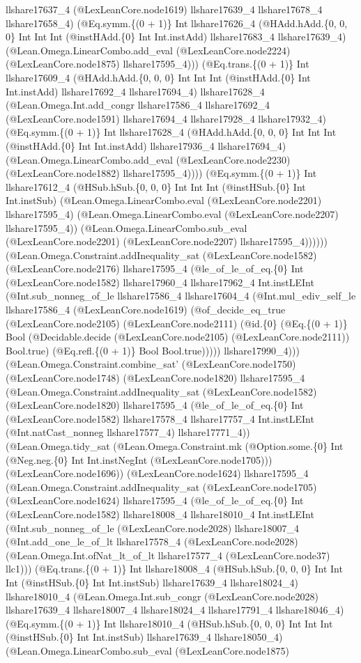 \documentclass[11pt]{article}
\begin{document}
llshare17637\_4 (@LexLeanCore.node1619) llshare17639\_4 llshare17678\_4 llshare17658\_4) (@Eq.symm.\{(0 + 1)\} Int llshare17626\_4 (@HAdd.hAdd.\{0, 0, 0\} Int Int Int (@instHAdd.\{0\} Int Int.instAdd) llshare17683\_4 llshare17639\_4) (@Lean.Omega.LinearCombo.add\_eval (@LexLeanCore.node2224) (@LexLeanCore.node1875) llshare17595\_4))) (@Eq.trans.\{(0 + 1)\} Int llshare17609\_4 (@HAdd.hAdd.\{0, 0, 0\} Int Int Int (@instHAdd.\{0\} Int Int.instAdd) llshare17692\_4 llshare17694\_4) llshare17628\_4 (@Lean.Omega.Int.add\_congr llshare17586\_4 llshare17692\_4 (@LexLeanCore.node1591) llshare17694\_4 llshare17928\_4 llshare17932\_4) (@Eq.symm.\{(0 + 1)\} Int llshare17628\_4 (@HAdd.hAdd.\{0, 0, 0\} Int Int Int (@instHAdd.\{0\} Int Int.instAdd) llshare17936\_4 llshare17694\_4) (@Lean.Omega.LinearCombo.add\_eval (@LexLeanCore.node2230) (@LexLeanCore.node1882) llshare17595\_4)))) (@Eq.symm.\{(0 + 1)\} Int llshare17612\_4 (@HSub.hSub.\{0, 0, 0\} Int Int Int (@instHSub.\{0\} Int Int.instSub) (@Lean.Omega.LinearCombo.eval (@LexLeanCore.node2201) llshare17595\_4) (@Lean.Omega.LinearCombo.eval (@LexLeanCore.node2207) llshare17595\_4)) (@Lean.Omega.LinearCombo.sub\_eval (@LexLeanCore.node2201) (@LexLeanCore.node2207) llshare17595\_4)))))) (@Lean.Omega.Constraint.addInequality\_sat (@LexLeanCore.node1582) (@LexLeanCore.node2176) llshare17595\_4 (@le\_of\_le\_of\_eq.\{0\} Int (@LexLeanCore.node1582) llshare17960\_4 llshare17962\_4 Int.instLEInt (@Int.sub\_nonneg\_of\_le llshare17586\_4 llshare17604\_4 (@Int.mul\_ediv\_self\_le llshare17586\_4 (@LexLeanCore.node1619) (@of\_decide\_eq\_true (@LexLeanCore.node2105) (@LexLeanCore.node2111) (@id.\{0\} (@Eq.\{(0 + 1)\} Bool (@Decidable.decide (@LexLeanCore.node2105) (@LexLeanCore.node2111)) Bool.true) (@Eq.refl.\{(0 + 1)\} Bool Bool.true))))) llshare17990\_4))) (@Lean.Omega.Constraint.combine\_sat' (@LexLeanCore.node1750) (@LexLeanCore.node1748) (@LexLeanCore.node1820) llshare17595\_4 (@Lean.Omega.Constraint.addInequality\_sat (@LexLeanCore.node1582) (@LexLeanCore.node1820) llshare17595\_4 (@le\_of\_le\_of\_eq.\{0\} Int (@LexLeanCore.node1582) llshare17578\_4 llshare17757\_4 Int.instLEInt (@Int.natCast\_nonneg llshare17577\_4) llshare17771\_4)) (@Lean.Omega.tidy\_sat (@Lean.Omega.Constraint.mk (@Option.some.\{0\} Int (@Neg.neg.\{0\} Int Int.instNegInt (@LexLeanCore.node1705))) (@LexLeanCore.node1696)) (@LexLeanCore.node1624) llshare17595\_4 (@Lean.Omega.Constraint.addInequality\_sat (@LexLeanCore.node1705) (@LexLeanCore.node1624) llshare17595\_4 (@le\_of\_le\_of\_eq.\{0\} Int (@LexLeanCore.node1582) llshare18008\_4 llshare18010\_4 Int.instLEInt (@Int.sub\_nonneg\_of\_le (@LexLeanCore.node2028) llshare18007\_4 (@Int.add\_one\_le\_of\_lt llshare17578\_4 (@LexLeanCore.node2028) (@Lean.Omega.Int.ofNat\_lt\_of\_lt llshare17577\_4 (@LexLeanCore.node37) llc1))) (@Eq.trans.\{(0 + 1)\} Int llshare18008\_4 (@HSub.hSub.\{0, 0, 0\} Int Int Int (@instHSub.\{0\} Int Int.instSub) llshare17639\_4 llshare18024\_4) llshare18010\_4 (@Lean.Omega.Int.sub\_congr (@LexLeanCore.node2028) llshare17639\_4 llshare18007\_4 llshare18024\_4 llshare17791\_4 llshare18046\_4) (@Eq.symm.\{(0 + 1)\} Int llshare18010\_4 (@HSub.hSub.\{0, 0, 0\} Int Int Int (@instHSub.\{0\} Int Int.instSub) llshare17639\_4 llshare18050\_4) (@Lean.Omega.LinearCombo.sub\_eval (@LexLeanCore.node1875) 
\end{document}
